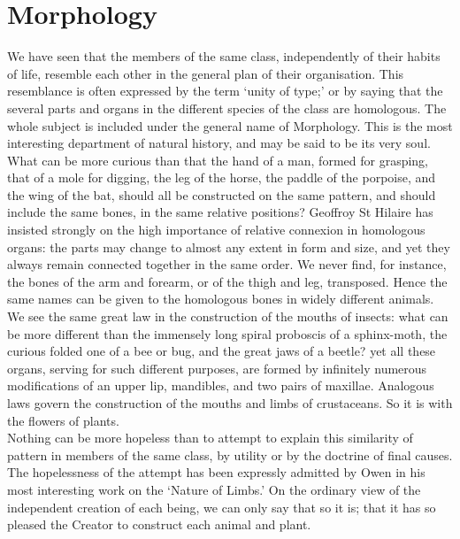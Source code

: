 \section{Morphology}
\indent We have seen that the members of the same class, independently of their habits of life, resemble each other in the general plan of their organisation. This resemblance is often expressed by the term `unity of type;' or by saying that the several parts and organs in the different species of the class are homologous. The whole subject is included under the general name of Morphology. This is the most interesting department of natural history, and may be said to be its very soul. What can be more curious than that the hand of a man, formed for grasping, that of a mole for digging, the leg of the horse, the paddle of the porpoise, and the wing of the bat, should all be constructed on the same pattern, and should include the same bones, in the same relative positions? Geoffroy St Hilaire has insisted strongly on the high importance of relative connexion in homologous organs: the parts may change to almost any extent in form and size, and yet they always remain connected together in the same order. We never find, for instance, the bones of the arm and forearm, or of the thigh and leg, transposed. Hence the same names can be given to the homologous bones in widely different animals. We see the same great law in the construction of the mouths of insects: what can be more different than the immensely long spiral proboscis of a sphinx-moth, the curious folded one of a bee or bug, and the great jaws of a beetle? yet all these organs, serving for such different purposes, are formed by infinitely numerous modifications of an upper lip, mandibles, and two pairs of maxillae. Analogous laws govern the construction of the mouths and limbs of crustaceans. So it is with the flowers of plants.~\\
\indent Nothing can be more hopeless than to attempt to explain this similarity of pattern in members of the same class, by utility or by the doctrine of final causes. The hopelessness of the attempt has been expressly admitted by Owen in his most interesting work on the `Nature of Limbs.' On the ordinary view of the independent creation of each being, we can only say that so it is; that it has so pleased the Creator to construct each animal and plant.~\\
